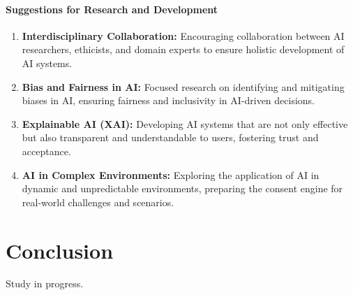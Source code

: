 \documentclass{article}
\begin{document}
\hypertarget{suggestions-for-research-and-development}{%
\paragraph{Suggestions for Research and
Development}\label{suggestions-for-research-and-development}}

\begin{enumerate}
\def\labelenumi{\arabic{enumi}.}
\item
  \textbf{Interdisciplinary Collaboration:} Encouraging collaboration
  between AI researchers, ethicists, and domain experts to ensure
  holistic development of AI systems.
\item
  \textbf{Bias and Fairness in AI:} Focused research on identifying and
  mitigating biases in AI, ensuring fairness and inclusivity in
  AI-driven decisions.
\item
  \textbf{Explainable AI (XAI):} Developing AI systems that are not only
  effective but also transparent and understandable to users, fostering
  trust and acceptance.
\item
  \textbf{AI in Complex Environments:} Exploring the application of AI
  in dynamic and unpredictable environments, preparing the consent
  engine for real-world challenges and scenarios.
\end{enumerate}

\hypertarget{conclusion}{%
\section*{Conclusion}\label{conclusion}}

Study in progress.



\end{document}

